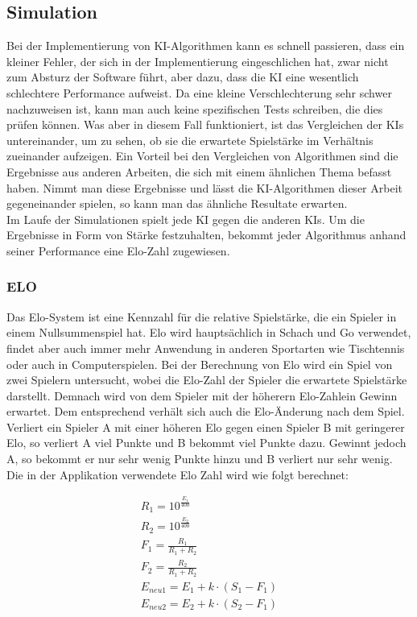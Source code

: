 \documentclass[12pt,a4paper,bibliography=totocnumbered,listof=totocnumbered]{article}
\begin{document}
\subsection{Simulation}
Bei der Implementierung von KI-Algorithmen kann es schnell passieren, dass ein kleiner Fehler, der sich in der Implementierung eingeschlichen hat, 
zwar nicht zum Absturz der Software führt, aber dazu, dass die KI eine wesentlich schlechtere Performance aufweist. Da eine kleine Verschlechterung 
sehr schwer nachzuweisen ist, kann man auch keine spezifischen Tests schreiben, die dies prüfen können. Was aber in diesem Fall funktioniert, 
ist das Vergleichen der KIs untereinander, um zu sehen, ob sie die erwartete Spielstärke im Verhältnis zueinander aufzeigen.
Ein Vorteil bei den Vergleichen von Algorithmen sind die Ergebnisse aus anderen Arbeiten, die sich mit einem ähnlichen Thema befasst haben.
Nimmt man diese Ergebnisse und lässt die KI-Algorithmen dieser Arbeit gegeneinander spielen, so kann man das ähnliche Resultate erwarten.
\\
Im Laufe der Simulationen spielt jede KI gegen die anderen KIs. Um die Ergebnisse in Form von Stärke festzuhalten, bekommt jeder Algorithmus anhand
seiner Performance eine Elo-Zahl zugewiesen.

\subsubsection{ELO}
Das Elo-System ist eine Kennzahl für die relative Spielstärke, die ein Spieler in einem Nullsummenspiel hat. Elo wird hauptsächlich in Schach und Go verwendet,
findet aber auch immer mehr Anwendung in anderen Sportarten wie Tischtennis oder auch in Computerspielen. Bei der Berechnung von Elo wird ein Spiel von zwei 
Spielern untersucht, wobei die Elo-Zahl der Spieler die erwartete Spielstärke darstellt. Demnach wird von dem Spieler mit der höherern Elo-Zahlein 
Gewinn erwartet. Dem entsprechend verhält sich auch die Elo-Änderung nach dem Spiel. Verliert ein Spieler A mit einer höheren Elo gegen einen
Spieler B mit geringerer Elo, so verliert A viel Punkte und B bekommt viel Punkte dazu. Gewinnt jedoch A, so bekommt er nur sehr wenig Punkte hinzu und B verliert 
nur sehr wenig. 
\\ 
Die in der Applikation verwendete Elo Zahl wird wie folgt berechnet:

\begin{align}
    R_1 = 10^{\frac{E_1}{400}} \\ 
    R_2 = 10^{\frac{E_2}{400}} \\
    F_1 = \frac{R_1}{R_1+R_2} \\ 
    F_2 = \frac{R_2}{R_1+R_2} \\
    E_{neu1} = E_1 + k \cdot (S_1 - F_1) \\ 
    E_{neu2} = E_2 + k \cdot (S_2 - F_1)  
\end{align}
\end{document}
